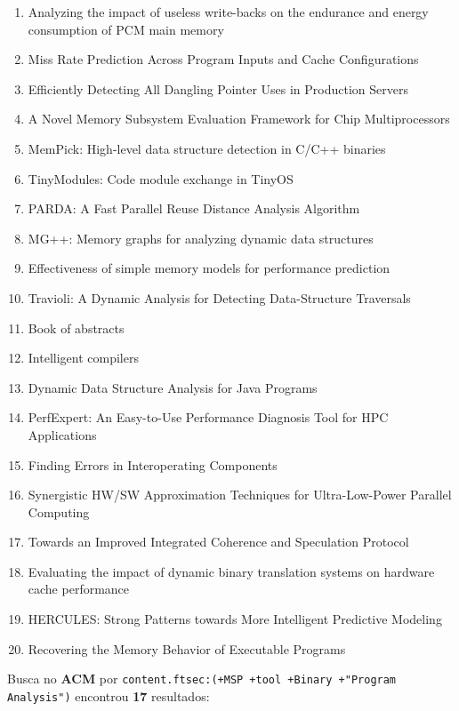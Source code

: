 \begin{enumerate}
\item Analyzing the impact of useless write-backs on the endurance and energy consumption of PCM main memory
\item Miss Rate Prediction Across Program Inputs and Cache Configurations
\item Efficiently Detecting All Dangling Pointer Uses in Production Servers
\item A Novel Memory Subsystem Evaluation Framework for Chip Multiprocessors
\item MemPick: High-level data structure detection in C/C++ binaries
\item TinyModules: Code module exchange in TinyOS
\item PARDA: A Fast Parallel Reuse Distance Analysis Algorithm
\item MG++: Memory graphs for analyzing dynamic data structures
\item Effectiveness of simple memory models for performance prediction
\item Travioli: A Dynamic Analysis for Detecting Data-Structure Traversals
\item Book of abstracts
\item Intelligent compilers
\item Dynamic Data Structure Analysis for Java Programs
\item PerfExpert: An Easy-to-Use Performance Diagnosis Tool for HPC Applications
\item Finding Errors in Interoperating Components
\item Synergistic HW/SW Approximation Techniques for Ultra-Low-Power Parallel Computing
\item Towards an Improved Integrated Coherence and Speculation Protocol
\item Evaluating the impact of dynamic binary translation systems on hardware cache performance
\item HERCULES: Strong Patterns towards More Intelligent Predictive Modeling
\item Recovering the Memory Behavior of Executable Programs
\end{enumerate}

Busca no {\bf ACM} por
\texttt{content.ftsec:(+MSP +tool +Binary +"Program Analysis")}
encontrou {\bf 17}
resultados:

